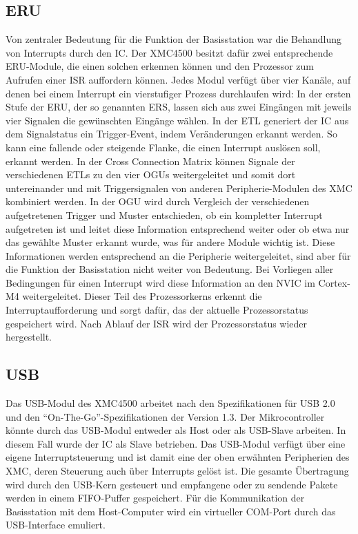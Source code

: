 \subsection{ERU}
Von zentraler Bedeutung für die Funktion der Basisstation war die Behandlung von Interrupts durch den  \ac{IC}. Der XMC4500 besitzt dafür zwei entsprechende \ac{ERU}-Module, die einen solchen erkennen können und den Prozessor zum Aufrufen einer \ac{ISR} auffordern können. Jedes Modul verfügt über vier Kanäle, auf denen  bei einem Interrupt ein vierstufiger Prozess durchlaufen wird: In der ersten Stufe der \ac{ERU}, der so genannten \ac{ERS}, lassen sich aus zwei Eingängen mit jeweils vier Signalen die gewünschten Eingänge wählen. In der \ac{ETL} generiert der \ac{IC} aus dem Signalstatus ein Trigger-Event, indem Veränderungen erkannt werden. So kann eine fallende oder steigende Flanke, die einen Interrupt auslösen soll, erkannt werden. In der Cross Connection Matrix können Signale der verschiedenen \acp{ETL} zu den vier \acp{OGU} weitergeleitet und somit dort untereinander und mit Triggersignalen von anderen Peripherie-Modulen des XMC kombiniert werden.  In der \ac{OGU} wird durch Vergleich der verschiedenen aufgetretenen Trigger und Muster entschieden, ob ein kompletter Interrupt aufgetreten ist und leitet diese Information entsprechend weiter oder ob etwa nur das gewählte Muster erkannt wurde, was für andere Module wichtig ist. Diese Informationen werden entsprechend an die Peripherie weitergeleitet, sind aber für die Funktion der Basisstation nicht weiter von Bedeutung. 
Bei Vorliegen aller Bedingungen für einen Interrupt wird diese Information an den \ac{NVIC} im Cortex-M4 weitergeleitet. Dieser Teil des Prozessorkerns erkennt die Interruptaufforderung und sorgt dafür, das der aktuelle Prozessorstatus gespeichert wird. Nach Ablauf der \ac{ISR} wird der Prozessorstatus wieder hergestellt.

\subsection{USB}
Das \ac{USB}-Modul des XMC4500 arbeitet nach den  Spezifikationen für USB 2.0 und den \enquote{On-The-Go}-Spezifikationen der Version 1.3. Der Mikrocontroller könnte durch das \ac{USB}-Modul entweder als Host oder als USB-Slave  arbeiten. In diesem Fall wurde der \ac{IC} als Slave betrieben. Das \ac{USB}-Modul verfügt über eine eigene Interruptsteuerung und ist damit eine der oben erwähnten Peripherien des XMC, deren Steuerung auch über Interrupts gelöst ist. Die gesamte Übertragung wird durch den \ac{USB}-Kern gesteuert und empfangene oder zu sendende Pakete werden in einem \ac{FIFO}-Puffer gespeichert. Für die Kommunikation der Basisstation mit dem Host-Computer wird ein virtueller COM-Port durch das \ac{USB}-Interface emuliert.

